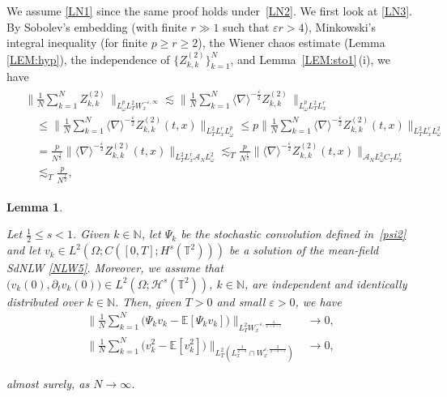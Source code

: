 \documentclass[10pt,a4paper]{amsart}
\newtheorem{lemma}{Lemma}
\newcommand{\A}{\mathcal{A}}
\newcommand{\E}{\mathbb{E}}
\renewcommand{\H}{\mathcal{H}}
\newcommand{\N}{\mathbb{N}}
\newcommand{\T}{\mathbb{T}}
\newcommand{\dt}{\partial_t}
\newcommand{\eps}{\varepsilon}
\newcommand{\jb}[1]{\langle #1 \rangle}
\newcommand{\les}{\lesssim}
\newcommand{\nb}{\nabla}
\newcommand{\noi}{\noindent}
\renewcommand{\o}{\omega}
\begin{document}
We assume 
\eqref{LN1} since the same proof holds under~\eqref{LN2}.
We first look at \eqref{LN3}. 
By Sobolev's embedding (with finite $r \gg1$ such that $\eps r > 4$),
 Minkowski's integral inequality
 (for finite $p \ge r \ge 2$),  the Wiener chaos estimate (Lemma \ref{LEM:hyp}), 
the independence
of $\{Z_{k, k}^{(2)}\}_{k = 1}^N$, 
and  Lemma~\ref{LEM:sto1}\,(i), we have
\begin{align}
\begin{split}
& \bigg\| \frac{1}{N} \sum_{k = 1}^N 
 Z_{k, k}^{(2)}\, \bigg\|_{L^p_\o L_T^2 W_x^{- \eps, \infty}} 
\les  \bigg\| \frac{1}{N} \sum_{k = 1}^N \jb{\nb}^{- \frac{\eps}{2}} 
Z_{k, k}^{(2)}\, 
\bigg\|_{L^p_\o L_T^2 L_x^r}\\
&\quad \leq  \bigg\| \frac{1}{N} \sum_{k = 1}^N \jb{\nb}^{- \frac{\eps}{2}} 
Z_{k, k}^{(2)}(t, x) \bigg\|_{L_T^2 L_x^r L^p_\o} 
\le p
 \bigg\| \frac{1}{N} \sum_{k = 1}^N \jb{\nb}^{- \frac{\eps}{2}} 
Z_{k, k}^{(2)}(t, x) \bigg\|_{L_T^2 L_x^r L^2_\o} \\
& \quad =  
\frac{p}{N^\frac 12 } 
\|  \jb{\nb}^{- \frac{\eps}{2}} 
Z_{k, k}^{(2)}(t, x) \|_{L_T^2 L_x^r \A_N L^2_\o} 
\les_T   
\frac{p }{N^\frac 12 } 
\|  \jb{\nb}^{- \frac{\eps}{2}} 
Z_{k, k}^{(2)}(t, x) \|_{\A_N L^2_\o C_T L_x^r } \\
&\quad \les_T \frac{p}{N^{\frac 12}},
\end{split}
\label{LN6}
\end{align}

\begin{lemma}
\label{LEM:LLN2}

Let $\frac 12 \le s < 1$.
Given $k \in \N$, 
let  $\Psi_k$ be the stochastic convolution defined in~\eqref{psi2} 
and let $v_k \in L^{2} (\Omega; C([0, T]; H^{s} (\T^2)))$ be a solution of the mean-field SdNLW \eqref{NLW5}.
Moreover, we assume that $\big(v_k(0), \dt v_k(0)\big)
\in L^{2} (\Omega; \H^s (\T^2))$, $k \in \N$, 
are independent and identically distributed over $k \in \N$.
Then, given $T > 0$
and small $\eps > 0$, 
we have 
\begin{align}
\bigg\| \frac{1}{N} \sum_{k = 1}^N 
\Big( \Psi_k v_k - \E [\Psi_k v_k] \Big) \bigg\|_{L_T^2
W^{-\eps, \frac 4{2- s - \eps}}_x} 
& \longrightarrow 0, 
\label{LNy2} \\
\bigg\| \frac{1}{N} \sum_{k = 1}^N
\Big( v_k^2 - \E [v_k^2] \Big) \bigg\|_{L_T^2 (L^\frac 3{2-s}_x
\cap W_x^{\eps, \frac 2{2-s-\eps}})
} & \longrightarrow 0, 
\label{LNy3} 
\end{align}


\noi
almost surely, as
 $N \to \infty$.


\end{lemma}
\end{document}
